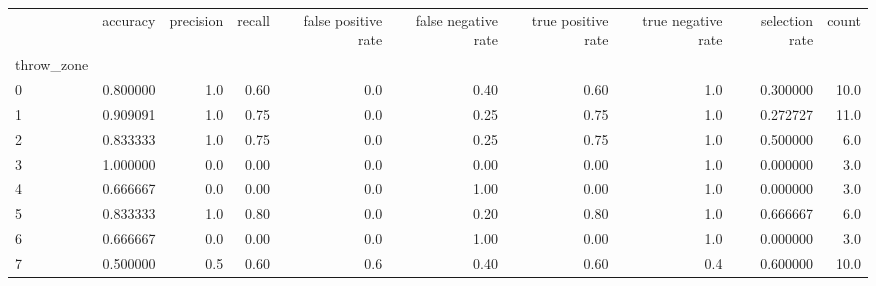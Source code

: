 \begin{tabular}{lrrrrrrrrr}
\toprule
{} &  accuracy &  precision &  recall &  false positive rate &  false negative rate &  true positive rate &  true negative rate &  selection rate &  count \\
throw\_zone &           &            &         &                      &                      &                     &                     &                 &        \\
\midrule
0          &  0.800000 &        1.0 &    0.60 &                  0.0 &                 0.40 &                0.60 &                 1.0 &        0.300000 &   10.0 \\
1          &  0.909091 &        1.0 &    0.75 &                  0.0 &                 0.25 &                0.75 &                 1.0 &        0.272727 &   11.0 \\
2          &  0.833333 &        1.0 &    0.75 &                  0.0 &                 0.25 &                0.75 &                 1.0 &        0.500000 &    6.0 \\
3          &  1.000000 &        0.0 &    0.00 &                  0.0 &                 0.00 &                0.00 &                 1.0 &        0.000000 &    3.0 \\
4          &  0.666667 &        0.0 &    0.00 &                  0.0 &                 1.00 &                0.00 &                 1.0 &        0.000000 &    3.0 \\
5          &  0.833333 &        1.0 &    0.80 &                  0.0 &                 0.20 &                0.80 &                 1.0 &        0.666667 &    6.0 \\
6          &  0.666667 &        0.0 &    0.00 &                  0.0 &                 1.00 &                0.00 &                 1.0 &        0.000000 &    3.0 \\
7          &  0.500000 &        0.5 &    0.60 &                  0.6 &                 0.40 &                0.60 &                 0.4 &        0.600000 &   10.0 \\
\bottomrule
\end{tabular}
